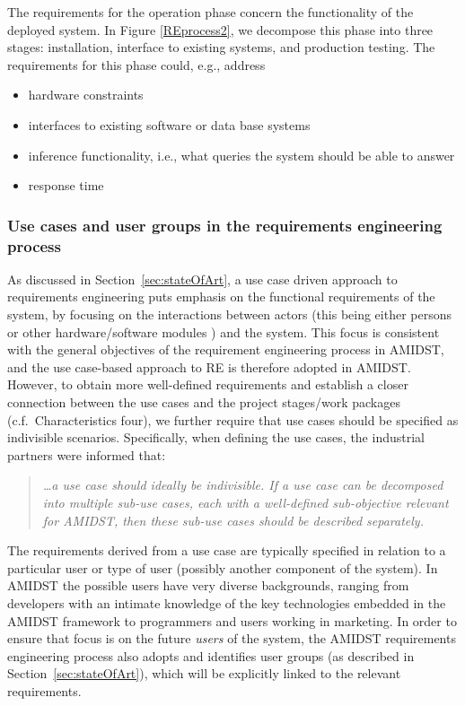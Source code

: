 The requirements for the operation phase concern the functionality of the deployed system. In Figure \ref{REprocess2}, we decompose this phase into three stages: installation, interface to existing systems, and production testing. The requirements for this phase could, e.g., address
\begin{itemize}
 \item hardware constraints
 \item interfaces to existing software or data base systems
 \item inference functionality, i.e., what queries the system should be able to answer
 \item response time
\end{itemize}


\subsubsection{Use cases and user groups in the requirements engineering process}

As discussed in Section~\ref{sec:stateOfArt}, a use case driven approach to requirements engineering puts emphasis on
the functional requirements of the system, by focusing on the
interactions between actors (this being either persons or other hardware/software modules ) and the system. This focus
is consistent with the general objectives of the requirement engineering process in AMIDST, and the use case-based
approach to RE is therefore adopted in AMIDST. However, to obtain more well-defined
requirements and establish a closer connection
between the use cases and the project stages/work packages (c.f.\ Characteristics four), we further require that use
cases should be specified as indivisible scenarios. Specifically, when defining the use cases, 
the industrial partners were informed that:

\begin{quote}
\emph{  \ldots a use case should ideally be indivisible. If a use case can be decomposed into multiple
  sub-use cases, each with a well-defined sub-objective relevant for AMIDST, then these sub-use cases should be
  described separately.}
\end{quote}

The requirements derived from a use case are typically specified in relation to a particular user or type of user (possibly another
component of the system). In AMIDST the possible users have very diverse backgrounds, ranging from developers with an
intimate knowledge of the key technologies embedded in the AMIDST framework to programmers and users working in
marketing. In order to ensure that focus is on the future \emph{users} of the system, the AMIDST requirements
engineering process also adopts and identifies user groups (as described in Section~\ref{sec:stateOfArt}), which will be
explicitly linked to the relevant requirements.

